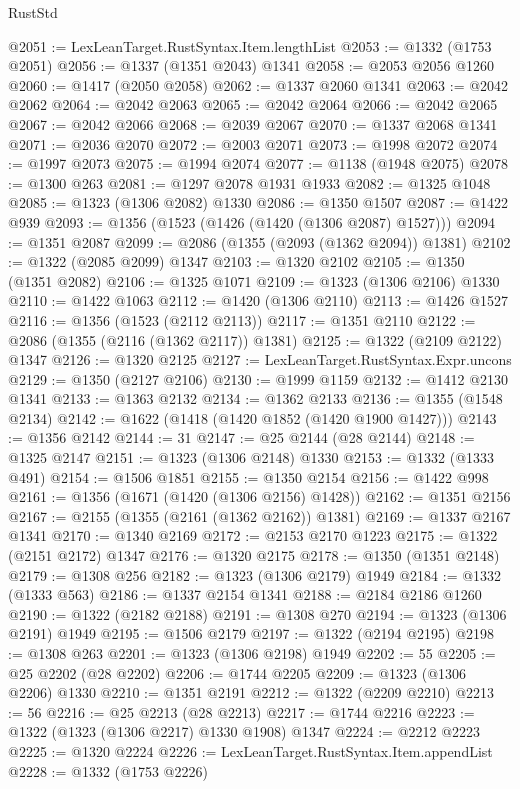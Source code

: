 \begin{lexlean}{RustStd}
\begin{coremodule}
@2051 := LexLeanTarget.RustSyntax.Item.lengthList
@2053 := @1332 (@1753 @2051)
@2056 := @1337 (@1351 @2043) @1341
@2058 := @2053 @2056 @1260
@2060 := @1417 (@2050 @2058)
@2062 := @1337 @2060 @1341
@2063 := @2042 @2062
@2064 := @2042 @2063
@2065 := @2042 @2064
@2066 := @2042 @2065
@2067 := @2042 @2066
@2068 := @2039 @2067
@2070 := @1337 @2068 @1341
@2071 := @2036 @2070
@2072 := @2003 @2071
@2073 := @1998 @2072
@2074 := @1997 @2073
@2075 := @1994 @2074
@2077 := @1138 (@1948 @2075)
@2078 := @1300 @263
@2081 := @1297 @2078 @1931 @1933
@2082 := @1325 @1048
@2085 := @1323 (@1306 @2082) @1330
@2086 := @1350 @1507
@2087 := @1422 @939
@2093 := @1356 (@1523 (@1426 (@1420 (@1306 @2087) @1527)))
@2094 := @1351 @2087
@2099 := @2086 (@1355 (@2093 (@1362 @2094)) @1381)
@2102 := @1322 (@2085 @2099) @1347
@2103 := @1320 @2102
@2105 := @1350 (@1351 @2082)
@2106 := @1325 @1071
@2109 := @1323 (@1306 @2106) @1330
@2110 := @1422 @1063
@2112 := @1420 (@1306 @2110)
@2113 := @1426 @1527
@2116 := @1356 (@1523 (@2112 @2113))
@2117 := @1351 @2110
@2122 := @2086 (@1355 (@2116 (@1362 @2117)) @1381)
@2125 := @1322 (@2109 @2122) @1347
@2126 := @1320 @2125
@2127 := LexLeanTarget.RustSyntax.Expr.uncons
@2129 := @1350 (@2127 @2106)
@2130 := @1999 @1159
@2132 := @1412 @2130 @1341
@2133 := @1363 @2132
@2134 := @1362 @2133
@2136 := @1355 (@1548 @2134)
@2142 := @1622 (@1418 (@1420 @1852 (@1420 @1900 @1427)))
@2143 := @1356 @2142
@2144 := 31
@2147 := @25 @2144 (@28 @2144)
@2148 := @1325 @2147
@2151 := @1323 (@1306 @2148) @1330
@2153 := @1332 (@1333 @491)
@2154 := @1506 @1851
@2155 := @1350 @2154
@2156 := @1422 @998
@2161 := @1356 (@1671 (@1420 (@1306 @2156) @1428))
@2162 := @1351 @2156
@2167 := @2155 (@1355 (@2161 (@1362 @2162)) @1381)
@2169 := @1337 @2167 @1341
@2170 := @1340 @2169
@2172 := @2153 @2170 @1223
@2175 := @1322 (@2151 @2172) @1347
@2176 := @1320 @2175
@2178 := @1350 (@1351 @2148)
@2179 := @1308 @256
@2182 := @1323 (@1306 @2179) @1949
@2184 := @1332 (@1333 @563)
@2186 := @1337 @2154 @1341
@2188 := @2184 @2186 @1260
@2190 := @1322 (@2182 @2188)
@2191 := @1308 @270
@2194 := @1323 (@1306 @2191) @1949
@2195 := @1506 @2179
@2197 := @1322 (@2194 @2195)
@2198 := @1308 @263
@2201 := @1323 (@1306 @2198) @1949
@2202 := 55
@2205 := @25 @2202 (@28 @2202)
@2206 := @1744 @2205
@2209 := @1323 (@1306 @2206) @1330
@2210 := @1351 @2191
@2212 := @1322 (@2209 @2210)
@2213 := 56
@2216 := @25 @2213 (@28 @2213)
@2217 := @1744 @2216
@2223 := @1322 (@1323 (@1306 @2217) @1330 @1908) @1347
@2224 := @2212 @2223
@2225 := @1320 @2224
@2226 := LexLeanTarget.RustSyntax.Item.appendList
@2228 := @1332 (@1753 @2226)

\end{coremodule}
\end{lexlean}
